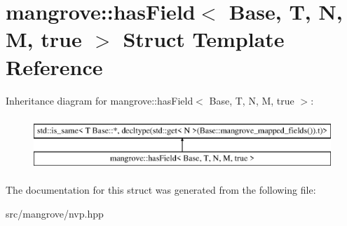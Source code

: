 \hypertarget{structmangrove_1_1hasField_3_01Base_00_01T_00_01N_00_01M_00_01true_01_4}{}\section{mangrove\+:\+:has\+Field$<$ Base, T, N, M, true $>$ Struct Template Reference}
\label{structmangrove_1_1hasField_3_01Base_00_01T_00_01N_00_01M_00_01true_01_4}
Inheritance diagram for mangrove\+:\+:has\+Field$<$ Base, T, N, M, true $>$\+:\begin{figure}[H]
\begin{center}
\leavevmode
\includegraphics[height=2.000000cm]{structmangrove_1_1hasField_3_01Base_00_01T_00_01N_00_01M_00_01true_01_4}
\end{center}
\end{figure}


The documentation for this struct was generated from the following file\+:\begin{DoxyCompactItemize}
\item 
src/mangrove/nvp.\+hpp\end{DoxyCompactItemize}
